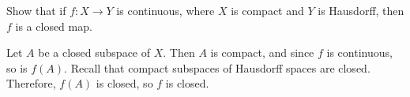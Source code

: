 	\begin{exercise}
		Show that if $f:X\to Y$ is continuous, where $X$ is compact and $Y$ is Hausdorff, then $f$ is a closed map.
	\end{exercise}
	\begin{solution*}
		Let $A$ be a closed subspace of $X$. Then $A$ is compact, and since $f$ is continuous, so is $f(A)$. Recall that compact subspaces of Hausdorff spaces are closed. Therefore, $f(A)$ is closed, so $f$ is closed.
	\end{solution*}


	
